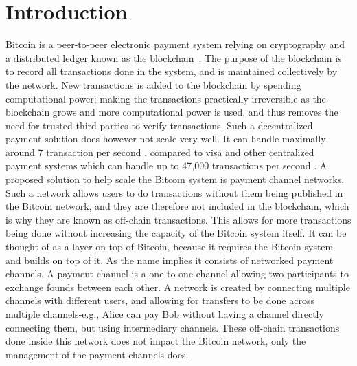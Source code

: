 \chapter{Introduction}
\label{chap:introduction}

Bitcoin is a peer-to-peer electronic payment system relying on cryptography and a distributed ledger known as the blockchain~\cite{nakamoto2008bitcoin}. 
The purpose of the blockchain is to record all transactions done in the system, and is maintained collectively by the network. New transactions is added to the blockchain by spending computational power; making the transactions practically irreversible as the blockchain grows and more computational power is used, and thus removes the need for trusted third parties to verify transactions. Such a decentralized payment solution does however not scale very well. It can handle maximally around 7 transaction per second \cite{poon2015bitcoin}, compared to visa and other centralized payment systems which can handle up to 47,000 transactions per second \cite{visa_stress}.
A proposed solution to help scale the Bitcoin system is payment channel networks. Such a network allows users to do transactions without them being published in the Bitcoin network, and they are therefore not included in the blockchain, which is why they are known as off-chain transactions. This allows for more transactions being done without increasing the capacity of the Bitcoin system itself. It can be thought of as a layer on top of Bitcoin, because it requires the Bitcoin system and builds on top of it. As the name implies it consists of networked payment channels. A payment channel is a one-to-one channel allowing two participants to exchange founds between each other. A network is created by connecting multiple channels with different users, and allowing for transfers to be done across multiple channels-e.g., Alice can pay Bob without having a channel directly connecting them, but using intermediary channels. These off-chain transactions done inside this network does not impact the Bitcoin network, only the management of the payment channels does.
\\ 

